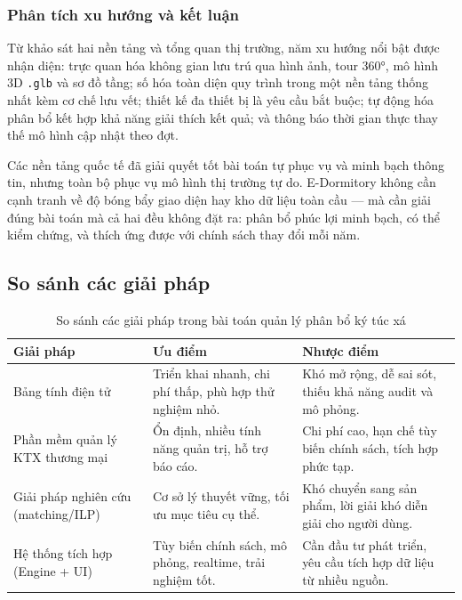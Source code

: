 \documentclass[../DoAn.tex]{subfiles}
\begin{document}
\subsubsection*{Phân tích xu hướng và kết luận}

Từ khảo sát hai nền tảng và tổng quan thị trường, năm xu hướng nổi bật được nhận diện: trực quan hóa không gian lưu trú qua hình ảnh, tour 360°, mô hình 3D \texttt{.glb} và sơ đồ tầng; số hóa toàn diện quy trình trong một nền tảng thống nhất kèm cơ chế lưu vết; thiết kế đa thiết bị là yêu cầu bắt buộc; tự động hóa phân bổ kết hợp khả năng giải thích kết quả; và thông báo thời gian thực thay thế mô hình cập nhật theo đợt.

Các nền tảng quốc tế đã giải quyết tốt bài toán tự phục vụ và minh bạch thông tin, nhưng toàn bộ phục vụ mô hình thị trường tự do. E-Dormitory không cần cạnh tranh về độ bóng bẩy giao diện hay kho dữ liệu toàn cầu --- mà cần giải đúng bài toán mà cả hai đều không đặt ra: phân bổ phúc lợi minh bạch, có thể kiểm chứng, và thích ứng được với chính sách thay đổi mỗi năm.

\subsection{So sánh các giải pháp}
{
\begin{table}[htbp]
\centering
\caption{So sánh các giải pháp trong bài toán quản lý phân bổ ký túc xá}
\label{tab:comparison}
\renewcommand{\arraystretch}{1.5}
\begin{tabular}{|p{4.0cm}|p{4.8cm}|p{4.8cm}|}
\hline
\textbf{Giải pháp} & \textbf{Ưu điểm} & \textbf{Nhược điểm} \\
\hline
Bảng tính điện tử
  & Triển khai nhanh, chi phí thấp, phù hợp thử nghiệm nhỏ.
  & Khó mở rộng, dễ sai sót, thiếu khả năng audit và mô phỏng. \\
\hline
Phần mềm quản lý KTX thương mại
  & Ổn định, nhiều tính năng quản trị, hỗ trợ báo cáo.
  & Chi phí cao, hạn chế tùy biến chính sách, tích hợp phức tạp. \\
\hline
Giải pháp nghiên cứu (matching/ILP)
  & Cơ sở lý thuyết vững, tối ưu mục tiêu cụ thể.
  & Khó chuyển sang sản phẩm, lời giải khó diễn giải cho người dùng. \\
\hline
Hệ thống tích hợp (Engine + UI)
  & Tùy biến chính sách, mô phỏng, realtime, trải nghiệm tốt.
  & Cần đầu tư phát triển, yêu cầu tích hợp dữ liệu từ nhiều nguồn. \\
\hline
\end{tabular}
\end{table}
}
\end{document}
